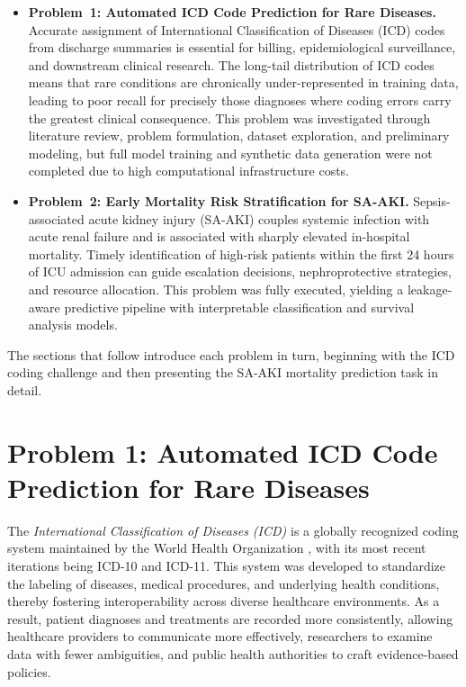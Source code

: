 \begin{itemize}
    \item \textbf{Problem~1: Automated ICD Code Prediction for Rare Diseases.} Accurate assignment of International Classification of Diseases (ICD) codes from discharge summaries is essential for billing, epidemiological surveillance, and downstream clinical research. The long-tail distribution of ICD codes means that rare conditions are chronically under-represented in training data, leading to poor recall for precisely those diagnoses where coding errors carry the greatest clinical consequence. This problem was investigated through literature review, problem formulation, dataset exploration, and preliminary modeling, but full model training and synthetic data generation were not completed due to high computational infrastructure costs.
    \item \textbf{Problem~2: Early Mortality Risk Stratification for SA-AKI.} Sepsis-associated acute kidney injury (SA-AKI) couples systemic infection with acute renal failure and is associated with sharply elevated in-hospital mortality. Timely identification of high-risk patients within the first 24 hours of ICU admission can guide escalation decisions, nephroprotective strategies, and resource allocation. This problem was fully executed, yielding a leakage-aware predictive pipeline with interpretable classification and survival analysis models.
\end{itemize}

The sections that follow introduce each problem in turn, beginning with the ICD coding challenge and then presenting the SA-AKI mortality prediction task in detail.

\section{Problem 1: Automated ICD Code Prediction for Rare Diseases}
\label{sec:p1:icd_intro}

The \emph{International Classification of Diseases (ICD)} is a globally recognized coding system maintained by the World Health Organization \citep{who2019icd11}, with its most recent iterations being ICD-10 and ICD-11. This system was developed to standardize the labeling of diseases, medical procedures, and underlying health conditions, thereby fostering interoperability across diverse healthcare environments. As a result, patient diagnoses and treatments are recorded more consistently, allowing healthcare providers to communicate more effectively, researchers to examine data with fewer ambiguities, and public health authorities to craft evidence-based policies.

